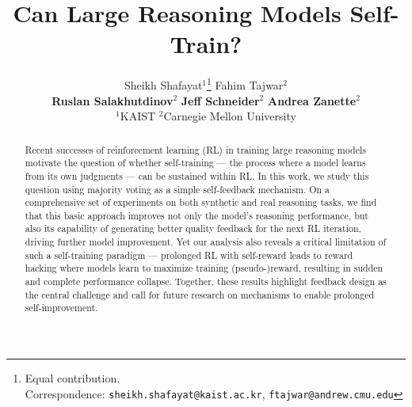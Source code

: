 \documentclass{article}
\title{Can Large Reasoning Models Self-Train?}
\author{Sheikh Shafayat$^{1}$\thanks{Equal contribution.
  \\ \indent Correspondence: \texttt{sheikh.shafayat@kaist.ac.kr}, \texttt{ftajwar@andrew.cmu.edu}}
  \quad
  Fahim Tajwar$^{2}$\footnotemark[1]
  \\[0.5ex]
  \textbf{Ruslan Salakhutdinov}$^{2}$
  \quad
  \textbf{Jeff Schneider}$^{2}$
  \quad
  \textbf{Andrea Zanette}$^{2}$
  \\[1ex]
  $^{1}$KAIST \quad $^{2}$Carnegie Mellon University
}
\begin{document}
\maketitle

\begin{abstract}

Recent successes of reinforcement learning (RL) in training large reasoning models motivate the question of whether self-training — the process where a model learns from its own judgments — can be sustained within RL. In this work, we study this question using majority voting as a simple self-feedback mechanism. On a comprehensive set of experiments on both synthetic and real reasoning tasks, we find that this basic approach improves not only the model's reasoning performance, but also its capability of generating better quality feedback for the next RL iteration, driving further model improvement. Yet our analysis also reveals a critical limitation of such a self-training paradigm --- prolonged RL with self-reward leads to reward hacking where models learn to maximize training (pseudo-)reward,
resulting in sudden and complete performance collapse. 
Together, these results highlight feedback design as the central challenge and call for future research on mechanisms to enable prolonged self-improvement.

\end{abstract}













\newpage

\end{document}

